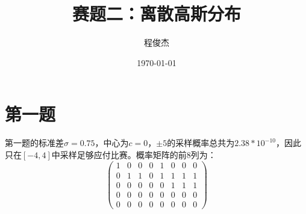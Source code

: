 \documentclass{article}
\title{赛题二：离散高斯分布}
\author{程俊杰}
\date{\today}
\begin{document}
	\maketitle
	\section{第一题}
	第一题的标准差$\sigma = 0.75$，中心为$c = 0$，$\pm5$的采样概率总共为$2.38 * 10^{-10}$，因此只在$[-4, 4]$中采样足够应付比赛。概率矩阵的前8列为：
	\begin{equation}
		\begin{pmatrix}
			1 & 0 & 0 & 0 & 1 & 0 & 0 & 0 \\
			0 & 1 & 1 & 0 & 1 & 1 & 1 & 1 \\
			0 & 0 & 0 & 0 & 0 & 1 & 1 & 1 \\
			0 & 0 & 0 & 0 & 0 & 0 & 0 & 0 \\
			0 & 0 & 0 & 0 & 0 & 0 & 0 & 0
		\end{pmatrix}
	\end{equation}
	
\end{document}
